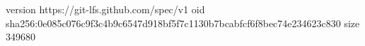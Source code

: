 version https://git-lfs.github.com/spec/v1
oid sha256:0e085c076c9f3c4b9c6547d918bf5f7c1130b7bcabfcf6f8bec74e234623c830
size 349680
